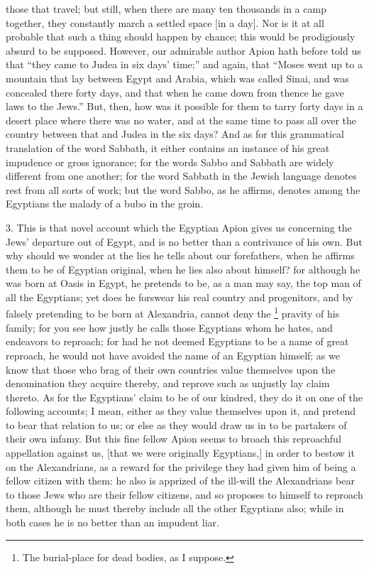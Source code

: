 those that travel; but still, when there are many ten thousands in a camp
together, they constantly march a settled space [in a day]. Nor is it at
all probable that such a thing should happen by chance; this would be
prodigiously absurd to be supposed. However, our admirable author Apion
hath before told us that ``they came to Judea in six days' time;'' and
again, that ``Moses went up to a mountain that lay between Egypt and
Arabia, which was called Sinai, and was concealed there forty days, and
that when he came down from thence he gave laws to the Jews.'' But, then,
how was it possible for them to tarry forty days in a desert place where
there was no water, and at the same time to pass all over the country
between that and Judea in the six days? And as for this grammatical
translation of the word Sabbath, it either contains an instance of his
great impudence or gross ignorance; for the words Sabbo and Sabbath are
widely different from one another; for the word Sabbath in the Jewish
language denotes rest from all sorts of work; but the word Sabbo, as he
affirms, denotes among the Egyptians the malady of a bubo in the groin.

3. This is that novel account which the Egyptian Apion gives us concerning
the Jews' departure out of Egypt, and is no better than a contrivance of
his own. But why should we wonder at the lies he tells about our
forefathers, when he affirms them to be of Egyptian original, when he lies
also about himself? for although he was born at Oasis in Egypt, he
pretends to be, as a man may say, the top man of all the Egyptians; yet
does he forswear his real country and progenitors, and by falsely
pretending to be born at Alexandria, cannot deny the \footnote{The burial-place for dead
bodies, as I suppose.} pravity of
his family; for you see how justly he calls those Egyptians whom he hates,
and endeavors to reproach; for had he not deemed Egyptians to be a name of
great reproach, he would not have avoided the name of an Egyptian himself;
as we know that those who brag of their own countries value themselves
upon the denomination they acquire thereby, and reprove such as unjustly
lay claim thereto. As for the Egyptians' claim to be of our kindred, they
do it on one of the following accounts; I mean, either as they value
themselves upon it, and pretend to bear that relation to us; or else as
they would draw us in to be partakers of their own infamy. But this fine
fellow Apion seems to broach this reproachful appellation against us,
[that we were originally Egyptians,] in order to bestow it on the
Alexandrians, as a reward for the privilege they had given him of being a
fellow citizen with them: he also is apprized of the ill-will the
Alexandrians bear to those Jews who are their fellow citizens, and so
proposes to himself to reproach them, although he must thereby include all
the other Egyptians also; while in both cases he is no better than an
impudent liar.

